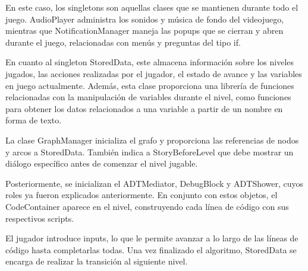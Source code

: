 \restoregeometry

En este caso, los singletons son aquellas clases que se mantienen durante todo el juego. AudioPlayer administra los sonidos y música de fondo del videojuego, mientras que NotificationManager maneja las popups que se cierran y abren durante el juego, relacionadas con menús y preguntas del tipo if.

En cuanto al singleton StoredData, este almacena información sobre los niveles jugados, las acciones realizadas por el jugador, el estado de avance y las variables en juego actualmente. Además, esta clase proporciona una librería de funciones relacionadas con la manipulación de variables durante el nivel, como funciones para obtener los datos relacionados a una variable a partir de un nombre en forma de texto.

La clase GraphManager inicializa el grafo y proporciona las referencias de nodos y arcos a StoredData. También indica a StoryBeforeLevel que debe mostrar un diálogo específico antes de comenzar el nivel jugable.

Posteriormente, se inicializan el ADTMediator, DebugBlock y ADTShower, cuyos roles ya fueron explicados anteriormente. En conjunto con estos objetos, el CodeContainer aparece en el nivel, construyendo cada línea de código con sus respectivos scripts.

El jugador introduce inputs, lo que le permite avanzar a lo largo de las líneas de código hasta completarlas todas. Una vez finalizado el algoritmo, StoredData se encarga de realizar la transición al siguiente nivel.

